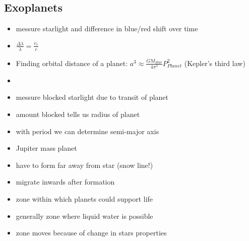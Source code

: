 \documentclass{article}
\theoremstyle{sltheorem}
\begin{document}
\subsection{Exoplanets}
\begin{itemize}
    \item messure starlight and difference in blue/red shift over time
    \item $\frac{\Delta\lambda}{\lambda}=\frac{v_r}{c}$
    \item Finding orbital distance of a planet: $a^3\approx \frac{GM_{Star}}{4\pi^2}P_{Planet}^2$ (Kepler's third law)
    \item {}
\end{itemize}
\begin{itemize}
    \item messure blocked starlight due to transit of planet
    \item amount blocked tells us radius of planet
    \item with period we can determine semi-major axis
\end{itemize}
\begin{itemize}
    \item Jupiter mass planet
    \item have to form far away from star (snow line!)
    \item migrate inwards after formation
\end{itemize}
\begin{itemize}
    \item zone within which planets could support life
    \item generally zone where liquid water is possible
    \item zone moves because of change in stars properties
\end{itemize}
\end{document}
